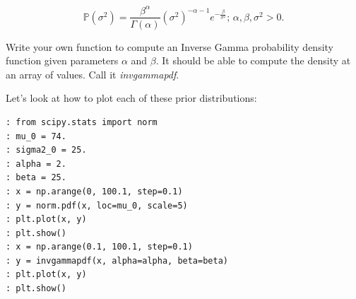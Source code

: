 $$\mathbb{P}(\sigma^{2}) = \frac{\beta^{\alpha}}{\Gamma(\alpha)}(\sigma^{2})^{-\alpha - 1}e^{-\frac{\beta}{\sigma^{2}}}\text{; } \alpha,\beta,\sigma^2 >0.$$

\begin{problem}
Write your own function to compute an Inverse Gamma probability density function given parameters $\alpha$ and $\beta$. It should be able to compute the density at an array of values. Call it \emph{invgammapdf}.
\end{problem}

Let's look at how to plot each of these prior distributions:

\begin{lstlisting}
: from scipy.stats import norm
: mu_0 = 74.
: sigma2_0 = 25.
: alpha = 2.
: beta = 25.
: x = np.arange(0, 100.1, step=0.1)
: y = norm.pdf(x, loc=mu_0, scale=5)
: plt.plot(x, y)
: plt.show()
: x = np.arange(0.1, 100.1, step=0.1)
: y = invgammapdf(x, alpha=alpha, beta=beta)
: plt.plot(x, y)
: plt.show()
\end{lstlisting}

